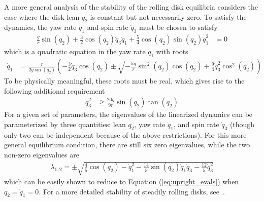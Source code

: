 \documentclass[smallcondensed,final]{svjour3}                     %
\begin{document}
A more general analysis of the stability of the rolling disk equilibria
considers the case where the disk lean $q_2$ is constant but not necessarily
zero. To satisfy the dynamics, the yaw rate $\dot{q}_1$ and spin rate
$\dot{q}_3$ must be chosen to satisfy
\begin{align}
  \frac{g}{r}\sin{(q_2)}  + \frac{3}{2}\cos{(q_2)} \dot{q}_3 \dot{q}_1 +
  \frac{5}{4}\cos{(q_2)}\sin{(q_2)} \dot{q}_1^2
 &= 0
\end{align}
which is a quadratic equation in the yaw rate $\dot{q}_1$ with roots
\begin{align}
\dot{q}_1 &= \frac{r}{2 g \sin\left(q_{2}\right)} \left( - \frac{3}{2} \dot{q}_{3}\cos\left(q_{2}\right) \pm \sqrt{- \frac{5 g}{r} \sin^{2}\left(q_{2}\right) \cos\left(q_{2}\right) + \frac{9}{4} \dot{q}_{3}^{2} \cos^{2}\left(q_{2}\right)} \right)
\end{align}
To be physically meaningful, these roots must be real, which gives rise to the following additional requirement
\begin{align}
  \dot{q}_3^2 &\geq \frac{20g}{9r}\sin{(q_2)} \tan{(q_2)}
\end{align}
For a given set of parameters, the eigenvalues of the linearized dynamics can be
parameterized by three quantities: lean $q_2$, yaw rate $\dot{q}_1$, and spin
rate $\dot{q}_3$ (though only two can be independent because of the above
restrictions). For this more general equilibrium condition, there are still six
zero eigenvalues, while the two non-zero eigenvalues are
\begin{align}
\lambda_{1,2} = \pm\sqrt{\frac{4}{5} \cos\left(q_{2}\right) - \dot{q}_{1}^{2} -\frac{14}{5} \sin\left(q_{2}\right) \dot{q}_{1} \dot{q}_{3} - \frac{12}{5}\dot{q}_{3}^{2}}
\end{align}
which can be easily shown to reduce to Equation (\ref{eq:upright_evals}) when
$q_2 = \dot{q}_1 = 0$. For a more detailed stability of steadily rolling disks,
see~\cite{O'Reilly1996,Neimark1972,Kuleshov2001}.
\end{document}
